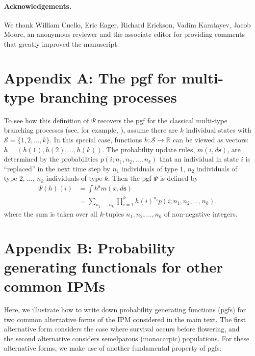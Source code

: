 \documentclass[12pt]{amsart}\usepackage[]{graphicx}\usepackage[]{color}
\def\R{\mathbb R}
\def\S{\mathcal S}
\def\s{\mathbf s}
\begin{document}
\vskip 0.1in
\paragraph{\bf Acknowledgements.} We thank William Cuello, Eric Eager, Richard Erickson, Vadim Karatayev, Jacob Moore, an anonymous reviewer and the associate editor for providing comments that greatly improved the manuscript.


\newpage
\section*{Appendix A: The pgf for multi-type branching processes}
To see how this definition of $\Psi$ recovers the pgf for the classical multi-type branching processes (see, for example, \citet{caswell-01}),  assume there are $k$ individual states with $\S=\{1,2,\dots,k\}$. In this special case, functions $h:\S\to \R$ can be viewed as vectors: $h=(h(1),h(2),\dots,h(k))$. The probability update rules, $m(i,d\s)$, are determined by the probabilities $p(i;n_1,n_2,\dots,n_k)$ that an individual in state $i$ is ``replaced'' in the next time step by  $n_1$ individuals of type $1$, $n_2$ individuals of type $2$, $\dots$, $n_k$ individuals of type $k$. Then the pgf $\Psi$ is defined by
\[
\begin{aligned}
\Psi(h)(i)&=\int h^\s m(x,d\s)\\
&= \sum_{n_1,\dots,n_k} \prod_{i=1}^k h(i)^{n_i} p(i;n_1,n_2,\dots,n_k).
\end{aligned}
\]
where the sum is taken over all $k$-tuples $n_1,n_2,\dots,n_k$ of non-negative integers.
\newpage

\section*{Appendix B: Probability generating functionals for other common IPMs}
Here, we illustrate how to write down probability generating functions (pgfs) for two common alternative forms of the IPM considered in the main text. The first alternative form considers the case where survival occurs before flowering, and the second alternative considers semelparous (monocarpic) populations. For these alternative forms, we make use of another fundamental property of pgfs:
\vskip 0.1in
\vskip 0.1in
\end{document}
